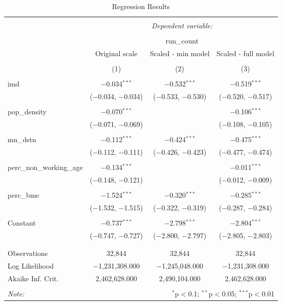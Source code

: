 \documentclass[]{article}
\begin{document}
\begin{table}[!htbp] \centering 
  \caption{Regression Results} 
  \label{} 
\begin{tabular}{@{\extracolsep{5pt}}lccc} 
\\[-1.8ex]\hline 
\hline \\[-1.8ex] 
 & \multicolumn{3}{c}{\textit{Dependent variable:}} \\ 
\cline{2-4} 
\\[-1.8ex] & \multicolumn{3}{c}{run\_count} \\ 
 & Original scale & Scaled - min model & Scaled - full model \\ 
\\[-1.8ex] & (1) & (2) & (3)\\ 
\hline \\[-1.8ex] 
 imd & $-$0.034$^{***}$ & $-$0.532$^{***}$ & $-$0.519$^{***}$ \\ 
  & ($-$0.034, $-$0.034) & ($-$0.533, $-$0.530) & ($-$0.520, $-$0.517) \\ 
  & & & \\ 
 pop\_density & $-$0.070$^{***}$ &  & $-$0.106$^{***}$ \\ 
  & ($-$0.071, $-$0.069) &  & ($-$0.108, $-$0.105) \\ 
  & & & \\ 
 mn\_dstn & $-$0.112$^{***}$ & $-$0.424$^{***}$ & $-$0.475$^{***}$ \\ 
  & ($-$0.112, $-$0.111) & ($-$0.426, $-$0.423) & ($-$0.477, $-$0.474) \\ 
  & & & \\ 
 perc\_non\_working\_age & $-$0.134$^{***}$ &  & $-$0.011$^{***}$ \\ 
  & ($-$0.148, $-$0.121) &  & ($-$0.012, $-$0.009) \\ 
  & & & \\ 
 perc\_bme & $-$1.524$^{***}$ & $-$0.320$^{***}$ & $-$0.285$^{***}$ \\ 
  & ($-$1.532, $-$1.515) & ($-$0.322, $-$0.319) & ($-$0.287, $-$0.284) \\ 
  & & & \\ 
 Constant & $-$0.737$^{***}$ & $-$2.798$^{***}$ & $-$2.804$^{***}$ \\ 
  & ($-$0.747, $-$0.727) & ($-$2.800, $-$2.797) & ($-$2.805, $-$2.803) \\ 
  & & & \\ 
\hline \\[-1.8ex] 
Observations & 32,844 & 32,844 & 32,844 \\ 
Log Likelihood & $-$1,231,308.000 & $-$1,245,048.000 & $-$1,231,308.000 \\ 
Akaike Inf. Crit. & 2,462,628.000 & 2,490,104.000 & 2,462,628.000 \\ 
\hline 
\hline \\[-1.8ex] 
\textit{Note:}  & \multicolumn{3}{r}{$^{*}$p$<$0.1; $^{**}$p$<$0.05; $^{***}$p$<$0.01} \\ 
\end{tabular} 
\end{table}
\end{document}
